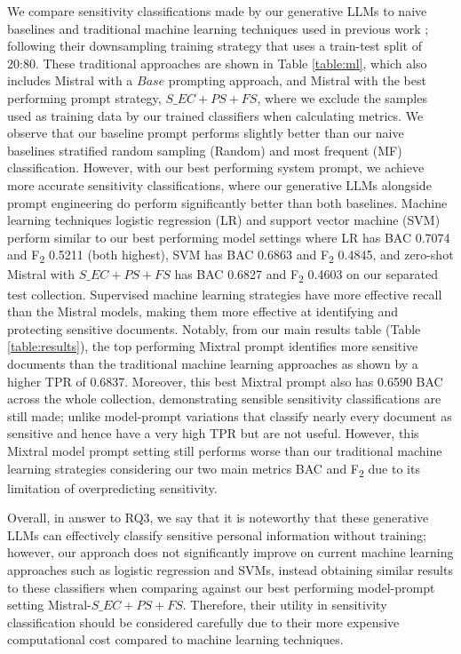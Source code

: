 We compare sensitivity classifications made by our generative LLMs to naive baselines and traditional machine learning techniques used in previous work \cite{mckechnie2024sara}; following their downsampling training strategy that uses a train-test split of 20:80. These traditional approaches are shown in Table \ref{table:ml}, which also includes Mistral with a $Base$ prompting approach, and Mistral with the best performing prompt strategy, $S\_EC+PS+FS$, where we exclude the samples used as training data by our trained classifiers when calculating metrics. We observe that our baseline prompt performs slightly better than our naive baselines stratified random sampling (Random) and most frequent (MF) classification. However, with our best performing system prompt, we achieve more accurate sensitivity classifications, where our generative LLMs alongside prompt engineering do perform significantly better than both baselines. Machine learning techniques logistic regression (LR) and support vector machine (SVM) perform similar to our best performing model settings where LR has BAC 0.7074 and F\textsubscript{2} 0.5211 (both highest), SVM has BAC 0.6863 and F\textsubscript{2} 0.4845, and zero-shot Mistral with $S\_EC+PS+FS$ has BAC 0.6827 and F\textsubscript{2} 0.4603 on our separated test collection. Supervised machine learning strategies have more effective recall than the Mistral models, making them more effective at identifying and protecting sensitive documents. Notably, from our main results table (Table \ref{table:results}), the top performing Mixtral prompt identifies more sensitive documents than the traditional machine learning approaches as shown by a higher TPR of 0.6837. Moreover, this best Mixtral prompt also has 0.6590 BAC across the whole collection, demonstrating sensible sensitivity classifications are still made; unlike model-prompt variations that classify nearly every document as sensitive and hence have a very high TPR but are not useful. However, this Mixtral model prompt setting still performs worse than our traditional machine learning strategies considering our two main metrics BAC and F\textsubscript{2} due to its limitation of overpredicting sensitivity.

Overall, in answer to RQ3, we say that it is noteworthy that these generative LLMs can effectively classify sensitive personal information without training; however, our approach does not significantly improve on current machine learning approaches such as logistic regression and SVMs, instead obtaining similar results to these classifiers when comparing against our best performing model-prompt setting Mistral-$S\_EC+PS+FS$. Therefore, their utility in sensitivity classification should be considered carefully due to their more expensive computational cost compared to machine learning techniques.

